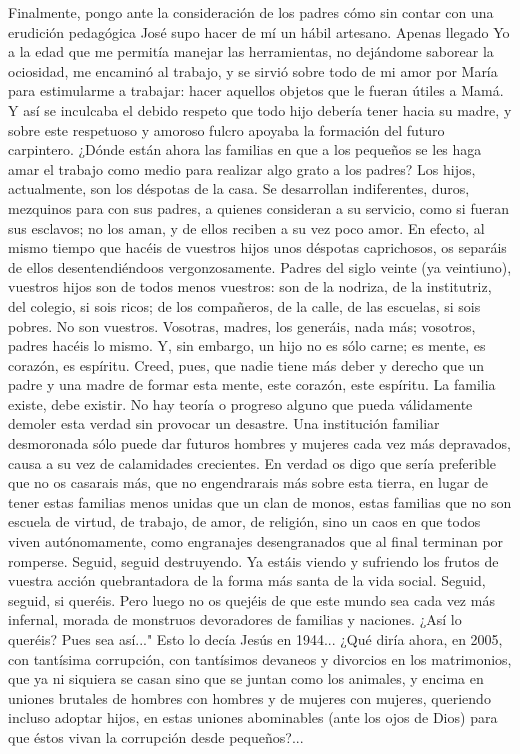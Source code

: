 \documentclass[12pt]{book} %
\begin{document}
Finalmente, pongo ante la consideración de los padres cómo sin contar con una erudición pedagógica José supo hacer 
de mí un hábil artesano. Apenas llegado Yo a la edad que me permitía manejar las herramientas, no dejándome saborear la ociosidad, me encaminó al trabajo, y se sirvió sobre todo de mi amor por María para estimularme a trabajar: hacer aquellos objetos que le fueran útiles a Mamá. Y así se inculcaba el debido respeto que todo hijo debería tener hacia su madre, y sobre este respetuoso y amoroso fulcro apoyaba la formación del futuro carpintero. 
¿Dónde están ahora las familias en que a los pequeños se les haga amar el trabajo como medio para realizar algo grato 
a los padres? Los hijos, actualmente, son los déspotas de la casa. Se desarrollan indiferentes, duros, mezquinos para con sus padres, a quienes consideran a su servicio, como si fueran sus esclavos; no los aman, y de ellos reciben a su vez poco amor. En efecto, al mismo tiempo que hacéis de vuestros hijos unos déspotas caprichosos, os separáis de ellos desentendiéndoos vergonzosamente. 
Padres del siglo veinte (ya veintiuno), vuestros hijos son de todos menos vuestros: son de la nodriza, de la institutriz, del 
colegio, si sois ricos; de los compañeros, de la calle, de las escuelas, si sois pobres. No son vuestros. Vosotras, madres, los generáis, nada más; vosotros, padres hacéis lo mismo. Y, sin embargo, un hijo no es sólo carne; es mente, es corazón, es espíritu. 
Creed, pues, que nadie tiene más deber y derecho que un padre y una madre de formar esta mente, este corazón, este espíritu.         
La familia existe, debe existir. No hay teoría o progreso alguno que pueda válidamente demoler esta verdad sin provocar un desastre. Una institución familiar desmoronada sólo puede dar futuros hombres y mujeres cada vez más depravados, causa a su vez de calamidades crecientes. En verdad os digo que sería preferible que no os casarais más, que no engendrarais más sobre esta tierra, en lugar de tener estas familias menos unidas que un clan de monos, estas familias que no son escuela de virtud, de trabajo, de amor, de religión, sino un caos en que todos viven autónomamente, como engranajes desengranados que al final terminan por romperse. 
Seguid, seguid destruyendo. Ya estáis viendo y sufriendo los frutos de vuestra acción quebrantadora de la forma más 
santa de la vida social. Seguid, seguid, si queréis. Pero luego no os quejéis de que este mundo sea cada vez más infernal, morada de monstruos devoradores de familias y naciones. ¿Así lo queréis? Pues sea así..." 
Esto lo decía Jesús en 1944... ¿Qué diría ahora, en 2005, con tantísima corrupción, con tantísimos devaneos y divorcios 
en los matrimonios, que ya ni siquiera se casan sino que se juntan como los animales, y encima en uniones brutales de hombres con hombres y de mujeres con mujeres, queriendo incluso adoptar hijos, en estas uniones abominables (ante los ojos de Dios) para que éstos vivan la corrupción desde pequeños?... 
 
\end{document}
